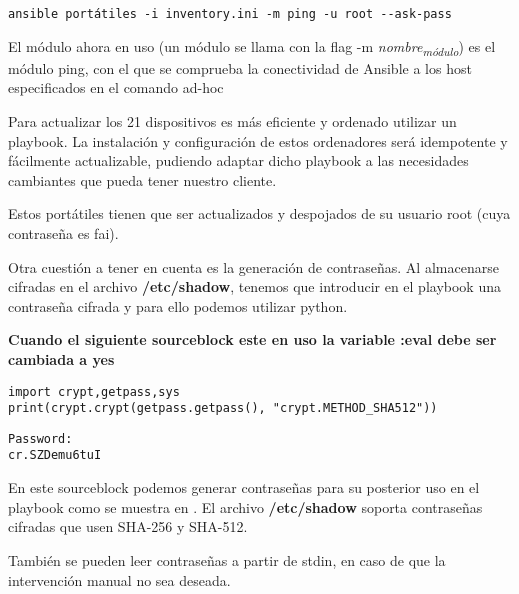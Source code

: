 \documentclass[11pt]{article}
\begin{document}
\begin{verbatim}
ansible portátiles -i inventory.ini -m ping -u root --ask-pass
\end{verbatim}

El módulo ahora en uso (un módulo se llama con la flag -m \emph{nombre\textsubscript{módulo}}) es el módulo ping, con el que se comprueba la conectividad de Ansible a los host especificados en el comando ad-hoc \cite[pp. 17-44]{ansi2020}

Para actualizar los 21 dispositivos es más eficiente y ordenado utilizar un playbook. La instalación y configuración de estos ordenadores será idempotente y fácilmente actualizable, pudiendo adaptar dicho playbook a las necesidades cambiantes que pueda tener nuestro cliente.

Estos portátiles tienen que ser actualizados y despojados de su usuario root (cuya contraseña es fai).

Otra cuestión a tener en cuenta es la generación de contraseñas. Al almacenarse cifradas en el archivo \textbf{/etc/shadow}, tenemos que introducir en el playbook una contraseña cifrada y para ello podemos utilizar python.

\textbf{Cuando el siguiente sourceblock este en uso la variable :eval debe ser cambiada a yes}

\begin{verbatim}
import crypt,getpass,sys
print(crypt.crypt(getpass.getpass(), "crypt.METHOD_SHA512"))
\end{verbatim}

\begin{verbatim}
Password:
cr.SZDemu6tuI
\end{verbatim}



En este sourceblock podemos generar contraseñas para su posterior uso en el playbook como se muestra en \cite{red2016}. El archivo \textbf{/etc/shadow} soporta contraseñas cifradas que usen SHA-256 y SHA-512.

También se pueden leer contraseñas a partir de stdin, en caso de que la intervención manual no sea deseada.
\end{document}
